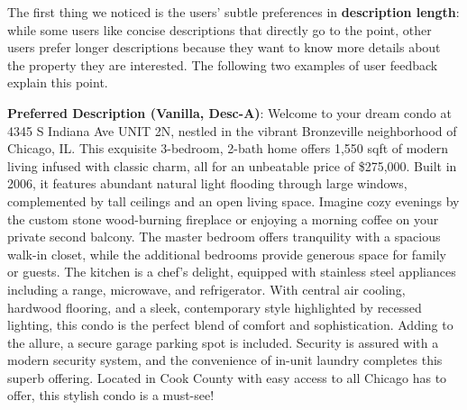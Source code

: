 The first thing we noticed is the users' subtle preferences in \textbf{description length}: while some users like concise descriptions that directly go to the point, other users prefer longer descriptions because they want to know more details about the property they are interested. The following two examples of user feedback explain this point. 
\begin{center}\begin{tcolorbox}[colback=white,colframe=gray!20,width=0.95\textwidth]
    {\footnotesize \textbf{Preferred Description (Vanilla, Desc-A)}:  Welcome to your dream condo at 4345 S Indiana Ave UNIT 2N, nestled in the vibrant Bronzeville neighborhood of Chicago, IL. This exquisite 3-bedroom, 2-bath home offers 1,550 sqft of modern living infused with classic charm, all for an unbeatable price of \$275,000. Built in 2006, it features abundant natural light flooding through large windows, complemented by tall ceilings and an open living space. Imagine cozy evenings by the custom stone wood-burning fireplace or enjoying a morning coffee on your private second balcony. The master bedroom offers tranquility with a spacious walk-in closet, while the additional bedrooms provide generous space for family or guests. The kitchen is a chef's delight, equipped with stainless steel appliances including a range, microwave, and refrigerator. With central air cooling, hardwood flooring, and a sleek, contemporary style highlighted by recessed lighting, this condo is the perfect blend of comfort and sophistication. Adding to the allure, a secure garage parking spot is included. Security is assured with a modern security system, and the convenience of in-unit laundry completes this superb offering. Located in Cook County with easy access to all Chicago has to offer, this stylish condo is a must-see! }
    \vspace{0.2em}


\end{tcolorbox}
\end{center}

